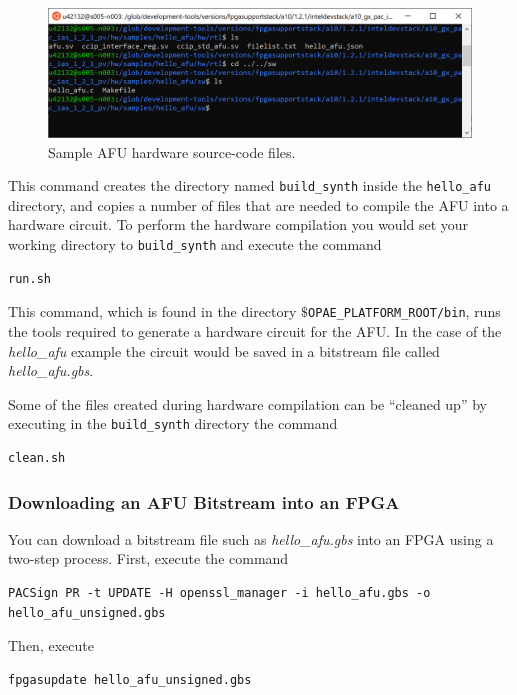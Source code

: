 \documentclass[11pt, twoside, pdftex]{article}
\begin{document}
\begin{figure}[H]
   \begin{center}
      \includegraphics[scale=0.7]{figures/sample.png}
   \caption{Sample AFU hardware source-code files.} 
	 \label{fig:sample}
	 \end{center}
\end{figure}

This command creates the directory named \texttt{build\_synth} inside the \texttt{hello\_afu}
directory, and copies a number of files that are needed to compile the AFU into a hardware
circuit. To perform the hardware compilation you would set your working directory to 
\texttt{build\_synth} and execute the command
\begin{lstlisting}
run.sh
\end{lstlisting}

This command, which is found in the directory $\$$\texttt{OPAE\_PLATFORM\_ROOT/bin}, runs the
tools required to generate a hardware circuit for the AFU. In the case of the {\it hello\_afu}
example the circuit would be saved in a bitstream file called {\it hello\_afu.gbs}.

Some of the files created during hardware compilation can be ``cleaned up'' by executing
in the \texttt{build\_synth} directory the command
\begin{lstlisting}
clean.sh
\end{lstlisting}

\subsubsection{Downloading an AFU Bitstream into an FPGA}

You can download a bitstream file such as {\it hello\_afu.gbs} into an FPGA using a 
two-step process.  First, execute the command 
\begin{lstlisting}
PACSign PR -t UPDATE -H openssl_manager -i hello_afu.gbs -o hello_afu_unsigned.gbs
\end{lstlisting}

Then, execute
\begin{lstlisting}
fpgasupdate hello_afu_unsigned.gbs
\end{lstlisting}
\end{document}
